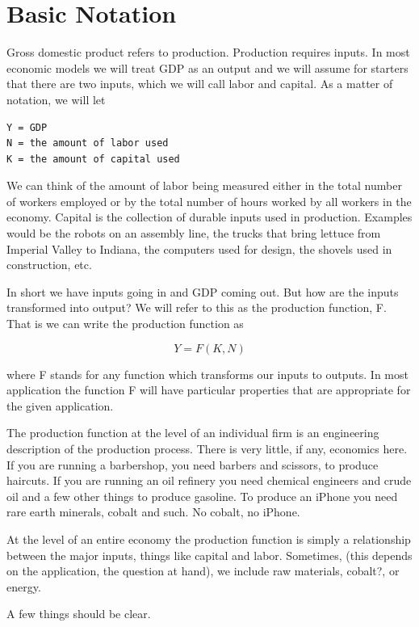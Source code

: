 \documentclass[
]{book}
\begin{document}
\hypertarget{basic-notation}{%
\section{Basic Notation}\label{basic-notation}}

Gross domestic product refers to production. Production requires inputs. In most economic models we will treat GDP as an output and we will assume for starters that there are two inputs, which we will call labor and capital. As a matter of notation, we will let

\begin{verbatim}
Y = GDP
N = the amount of labor used
K = the amount of capital used
\end{verbatim}

We can think of the amount of labor being measured either in the total number of workers employed or by the total number of hours worked by all workers in the economy. Capital is the collection of durable inputs used in production. Examples would be the robots on an assembly line, the trucks that bring lettuce from Imperial Valley to Indiana, the computers used for design, the shovels used in construction, etc.

In short we have inputs going in and GDP coming out. But how are the inputs transformed into output? We will refer to this as the production function, F. That is we can write the production function as

\[Y = F(K,N)\]

where F stands for any function which transforms our inputs to outputs. In most application the function F will have particular properties that are appropriate for the given application.

The production function at the level of an individual firm is an engineering description of the production process. There is very little, if any, economics here. If you are running a barbershop, you need barbers and scissors, to produce haircuts. If you are running an oil refinery you need chemical engineers and crude oil and a few other things to produce gasoline. To produce an iPhone you need rare earth minerals, cobalt and such. No cobalt, no iPhone.

At the level of an entire economy the production function is simply a relationship between the major inputs, things like capital and labor. Sometimes, (this depends on the application, the question at hand), we include raw materials, cobalt?, or energy.

A few things should be clear.
\end{document}

